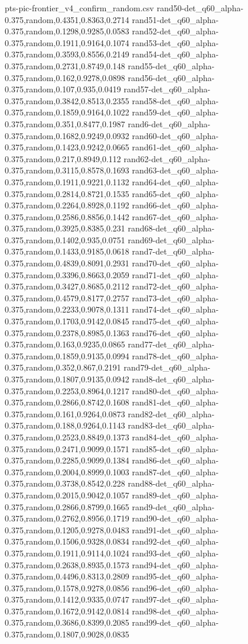 \begin{filecontents*}[overwrite]{pts-pic-frontier_v4_confirm_random.csv}
rand50-det_q60_alpha-0.375,random,0.4351,0.8363,0.2714
rand51-det_q60_alpha-0.375,random,0.1298,0.9285,0.0583
rand52-det_q60_alpha-0.375,random,0.1911,0.9164,0.1074
rand53-det_q60_alpha-0.375,random,0.3593,0.8556,0.2149
rand54-det_q60_alpha-0.375,random,0.2731,0.8749,0.148
rand55-det_q60_alpha-0.375,random,0.162,0.9278,0.0898
rand56-det_q60_alpha-0.375,random,0.107,0.935,0.0419
rand57-det_q60_alpha-0.375,random,0.3842,0.8513,0.2355
rand58-det_q60_alpha-0.375,random,0.1859,0.9164,0.1022
rand59-det_q60_alpha-0.375,random,0.351,0.8477,0.1987
rand6-det_q60_alpha-0.375,random,0.1682,0.9249,0.0932
rand60-det_q60_alpha-0.375,random,0.1423,0.9242,0.0665
rand61-det_q60_alpha-0.375,random,0.217,0.8949,0.112
rand62-det_q60_alpha-0.375,random,0.3115,0.8578,0.1693
rand63-det_q60_alpha-0.375,random,0.1911,0.9221,0.1132
rand64-det_q60_alpha-0.375,random,0.2814,0.8721,0.1535
rand65-det_q60_alpha-0.375,random,0.2264,0.8928,0.1192
rand66-det_q60_alpha-0.375,random,0.2586,0.8856,0.1442
rand67-det_q60_alpha-0.375,random,0.3925,0.8385,0.231
rand68-det_q60_alpha-0.375,random,0.1402,0.935,0.0751
rand69-det_q60_alpha-0.375,random,0.1433,0.9185,0.0618
rand7-det_q60_alpha-0.375,random,0.4839,0.8091,0.2931
rand70-det_q60_alpha-0.375,random,0.3396,0.8663,0.2059
rand71-det_q60_alpha-0.375,random,0.3427,0.8685,0.2112
rand72-det_q60_alpha-0.375,random,0.4579,0.8177,0.2757
rand73-det_q60_alpha-0.375,random,0.2233,0.9078,0.1311
rand74-det_q60_alpha-0.375,random,0.1703,0.9142,0.0845
rand75-det_q60_alpha-0.375,random,0.2378,0.8985,0.1363
rand76-det_q60_alpha-0.375,random,0.163,0.9235,0.0865
rand77-det_q60_alpha-0.375,random,0.1859,0.9135,0.0994
rand78-det_q60_alpha-0.375,random,0.352,0.867,0.2191
rand79-det_q60_alpha-0.375,random,0.1807,0.9135,0.0942
rand8-det_q60_alpha-0.375,random,0.2253,0.8964,0.1217
rand80-det_q60_alpha-0.375,random,0.2866,0.8742,0.1608
rand81-det_q60_alpha-0.375,random,0.161,0.9264,0.0873
rand82-det_q60_alpha-0.375,random,0.188,0.9264,0.1143
rand83-det_q60_alpha-0.375,random,0.2523,0.8849,0.1373
rand84-det_q60_alpha-0.375,random,0.2471,0.9099,0.1571
rand85-det_q60_alpha-0.375,random,0.2285,0.9099,0.1384
rand86-det_q60_alpha-0.375,random,0.2004,0.8999,0.1003
rand87-det_q60_alpha-0.375,random,0.3738,0.8542,0.228
rand88-det_q60_alpha-0.375,random,0.2015,0.9042,0.1057
rand89-det_q60_alpha-0.375,random,0.2866,0.8799,0.1665
rand9-det_q60_alpha-0.375,random,0.2762,0.8956,0.1719
rand90-det_q60_alpha-0.375,random,0.1205,0.9278,0.0483
rand91-det_q60_alpha-0.375,random,0.1506,0.9328,0.0834
rand92-det_q60_alpha-0.375,random,0.1911,0.9114,0.1024
rand93-det_q60_alpha-0.375,random,0.2638,0.8935,0.1573
rand94-det_q60_alpha-0.375,random,0.4496,0.8313,0.2809
rand95-det_q60_alpha-0.375,random,0.1578,0.9278,0.0856
rand96-det_q60_alpha-0.375,random,0.1412,0.9335,0.0747
rand97-det_q60_alpha-0.375,random,0.1672,0.9142,0.0814
rand98-det_q60_alpha-0.375,random,0.3686,0.8399,0.2085
rand99-det_q60_alpha-0.375,random,0.1807,0.9028,0.0835
\end{filecontents*}
